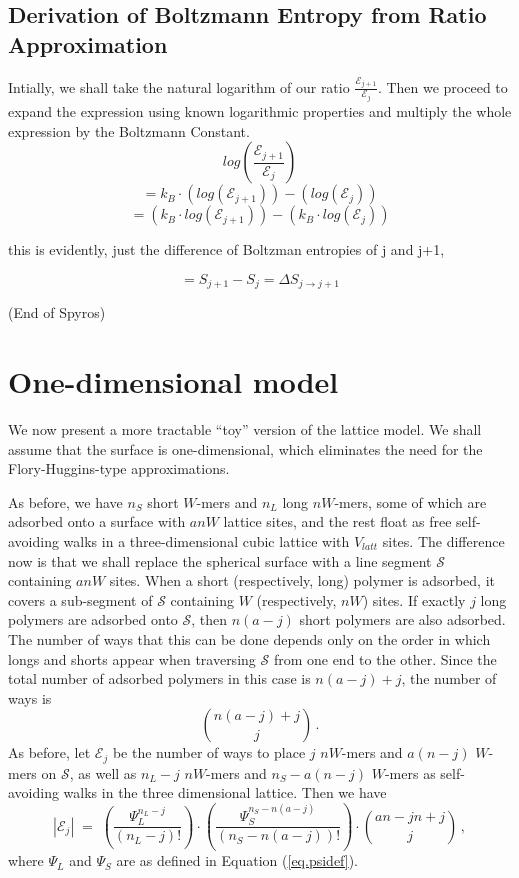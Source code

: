 \documentclass[journal=mamobx,manuscript=article]{achemso}
\begin{document}
\subsection{Derivation of Boltzmann Entropy from Ratio Approximation}

Intially, we shall take the natural logarithm of our ratio $\frac{\mathcal{E}_{j+1}}{\mathcal{E}_{j}}$. Then we proceed to expand the expression using known logarithmic properties and multiply the whole expression by the Boltzmann Constant.
$$log\left(\frac{\mathcal{E}_{j+1}}{\mathcal{E}_{j}}\right)$$
$$=k_B\cdot\left(log\left(\mathcal{E}_{j+1}\right)\right)-\left(log\left(\mathcal{E}_{j}\right)\right)$$
$$= \left(k_B\cdot log\left(\mathcal{E}_{j+1}\right)\right)-\left(k_B\cdot log\left(\mathcal{E}_{j}\right)\right)$$

\noindent this is evidently, just the difference of Boltzman entropies of j and j+1,

$$=S_{j+1}-S_{j}=\Delta S_{j\to j+1}$$

(End of Spyros)

\section{One-dimensional model}

We now present a more tractable ``toy'' version of the lattice model.  We shall assume that 
the surface is one-dimensional, which eliminates the need for the Flory-Huggins-type approximations.

As before, we have $n_S$ short $W$-mers and $n_L$ long $nW$-mers, some of which are adsorbed 
onto a surface with $anW$ lattice sites, and the rest float as free self-avoiding walks 
in a three-dimensional cubic lattice with  $V_{latt}$ sites.  
The difference now is that we shall replace the spherical surface with a line segment
$\mathcal{S}$ containing $anW$ sites.  When a short (respectively, long) polymer is adsorbed, it covers a 
sub-segment of $\mathcal{S}$ containing $W$ (respectively, $nW$) sites.
If exactly $j$ long polymers are adsorbed onto $\mathcal{S}$, then $n(a-j)$ short polymers are
also adsorbed.  The number of ways that this can be done depends only on the order in which 
longs and shorts appear when traversing $\mathcal{S}$ from one end to the other.  Since the total 
number of adsorbed polymers in this case is $n(a-j)+j$, the number of ways is 
\[      \binom{n(a-j)+j}{j}   \,.  \]
As before, let $\mathcal{E}_j$ be the number of ways to place $j$ $nW$-mers and $a(n-j)$ $W$-mers on 
$\mathcal{S}$, as well as $n_L-j$ $nW$-mers and $n_S-a(n-j)$ $W$-mers as self-avoiding walks 
in the three dimensional lattice.  Then we have 
\begin{equation}
   \label{eq.1dE}
    |\mathcal{E}_j| \;=\;  \left(\frac{\Psi_L^{n_{L}-j}}{(n_L-j)!}\right)\cdot\left(\frac{\Psi_S^{n_S-n(a-j)}}{
    (n_S-n(a-j))!}\right) \cdot\binom{an-jn+j}{j}   \,,
\end{equation}
where 
$\Psi_L$ and $\Psi_S$ are as defined in Equation (\ref{eq.psidef}).
\end{document}
